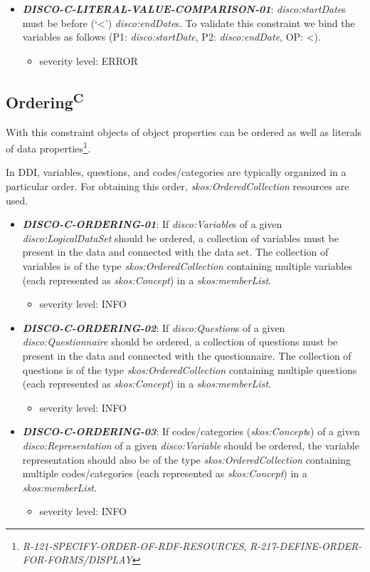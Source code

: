 \documentclass{llncs}
\begin{document}
\begin{itemize}
	\item \textbf{{\em DISCO-C-LITERAL-VALUE-COMPARISON-01}}:
{\em disco:startDate}s must be before (‘\textless’) {\em disco:endDate}s.
To validate this constraint we bind the variables as follows (P1: {\em disco:startDate}, P2: {\em disco:endDate}, OP: \textless). 
	\begin{itemize}
		\item severity level: ERROR
	\end{itemize}
\end{itemize}

\subsection{Ordering\textsuperscript{C}}

With this constraint objects of object properties can be ordered as well as literals of data properties\footnote{\emph{R-121-SPECIFY-ORDER-OF-RDF-RESOURCES}, \emph{R-217-DEFINE-ORDER-FOR-FORMS/DISPLAY}}.

In DDI, variables, questions, and codes/categories are typically organized in a particular order. 
For obtaining this order, {\em skos:OrderedCollection} resources are used. 

\begin{itemize}
	\item \textbf{{\em DISCO-C-ORDERING-01}}: If \emph{disco:Variable}s of a given \emph{disco:LogicalDataSet} should be ordered, a collection of variables must be present in the data and connected with the data set. The collection of variables is of the type {\em skos:OrderedCollection} containing multiple variables (each represented as {\em skos:Concept}) in a {\em skos:memberList}. 
	\begin{itemize}
		\item severity level: INFO
	\end{itemize}
	\item \textbf{{\em DISCO-C-ORDERING-02}}: If \emph{disco:Question}s of a given \emph{disco:Questionnaire} should be ordered, a collection of questions must be present in the data and connected with the questionnaire. The collection of questions is of the type {\em skos:OrderedCollection} containing multiple questions (each represented as {\em skos:Concept}) in a {\em skos:memberList}. 
	\begin{itemize}
		\item severity level: INFO
	\end{itemize}
	\item \textbf{{\em DISCO-C-ORDERING-03}}: If codes/categories (\emph{skos:Concept}s) of a given \emph{disco:Representation} of a given \emph{disco:Variable} should be ordered, the variable representation should also be of the type {\em skos:OrderedCollection} containing multiple codes/categories (each represented as {\em skos:Concept}) in a {\em skos:memberList}. 
	\begin{itemize}
		\item severity level: INFO
	\end{itemize}
\end{itemize}
\end{document}
